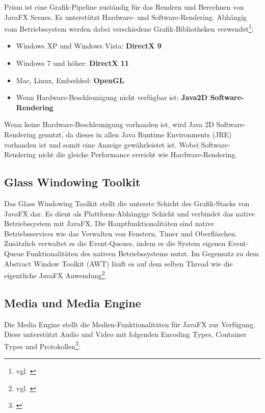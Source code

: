Prism ist eine Grafik-Pipeline zuständig für das Rendern und Berechnen von JavaFX Scenes. Es unterstützt Hardware- und Software-Rendering. Abhängig vom Betriebssystem werden dabei verschiedene Grafik-Bibliotheken verwendet\footnote{vgl. \cite{javafxarchitecture}}:

\begin{itemize}
	\item Windows XP und Windows Vista: \textbf{DirectX 9}
	\item Windows 7 und höher: \textbf{DirectX 11}
	\item Mac, Linux, Embedded: \textbf{OpenGL}
	\item Wenn Hardware-Beschleunigung nicht verfügbar ist: \textbf{Java2D Software-Rendering}
\end{itemize}

Wenn keine Hardware-Beschleunigung vorhanden ist, wird Java 2D Software-Rendering genutzt, da dieses in allen Java Runtime Environments (JRE) vorhanden ist und somit eine Anzeige gewährleistet ist. Wobei  Software-Rendering nicht die gleiche Performance erreicht wie Hardware-Rendering.


\subsection{Glass Windowing Toolkit}

Das Glass Windowing Toolkit stellt die unterste Schicht des Grafik-Stacks von JavaFX dar. Es dient als Plattform-Abhängige Schicht und verbindet das native Betriebssystem mit JavaFX. Die Hauptfunktionalitäten sind native Betriebsservices wie das Verwalten von Fenstern, Timer und Oberfläschen. Zusätzlich verwaltet es die Event-Queues, indem es die System eigenen Event-Queue Funktionalitäten des nativen Betriebssystems nutzt. Im Gegensatz zu dem Abstract Window Toolkit (AWT) läuft es auf dem selben Thread wie die eigentliche JavaFX Anwendung\footnote{vgl. \cite{javafxarchitecture}}.


\subsection{Media und Media Engine}

Die Media Engine stellt die Medien-Funktionalitäten für JavaFX zur Verfügung. Diese unterstützt Audio und Video mit folgenden Encoding Types, Container Types und Protokollen\footnote{\cite{javafxmedia}}:

